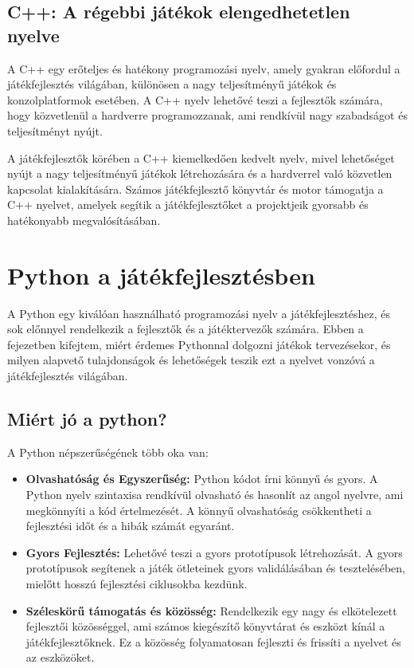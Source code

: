 \subsection{C++: A régebbi játékok elengedhetetlen nyelve}

 A C++ \cite{cpp-doc, cpp} egy erőteljes és hatékony programozási nyelv, amely gyakran előfordul a játékfejlesztés világában, különösen a nagy teljesítményű játékok és konzolplatformok esetében. A C++ nyelv lehetővé teszi a fejlesztők számára, hogy közvetlenül a hardverre programozzanak, ami rendkívül nagy szabadságot és teljesítményt nyújt.

A játékfejlesztők körében a C++ kiemelkedően kedvelt nyelv, mivel lehetőséget nyújt a nagy teljesítményű játékok létrehozására és a hardverrel való közvetlen kapcsolat kialakítására. Számos játékfejlesztő könyvtár és motor támogatja a C++ nyelvet, amelyek segítik a játékfejlesztőket a projektjeik gyorsabb és hatékonyabb megvalósításában.


\section{Python a játékfejlesztésben}

 A Python \cite{python} egy kiválóan használható programozási nyelv a játékfejlesztéshez, és sok előnnyel rendelkezik a fejlesztők és a játéktervezők számára. Ebben a fejezetben kifejtem, miért érdemes Pythonnal dolgozni játékok tervezésekor, és milyen alapvető tulajdonságok és lehetőségek teszik ezt a nyelvet vonzóvá a játékfejlesztés világában.

\subsection{Miért jó a python?}
A Python népszerűségének több oka van: \cite{why-is-python}

\begin{itemize}
\item    \textbf{Olvashatóság és Egyszerűség:}
    Python kódot írni könnyű és gyors. A Python nyelv szintaxisa rendkívül olvasható és hasonlít az angol nyelvre, ami megkönnyíti a kód értelmezését. A könnyű olvashatóság csökkentheti a fejlesztési időt és a hibák számát egyaránt. 
    
\item    \textbf{Gyors Fejlesztés:}
    Lehetővé teszi a gyors prototípusok létrehozását. A gyors prototípusok segítenek a játék ötleteinek gyors validálásában és tesztelésében, mielőtt hosszú fejlesztési ciklusokba kezdünk.
    
\item    \textbf{Széleskörű támogatás és közösség:}
    Rendelkezik egy nagy és elkötelezett fejlesztői közösséggel, ami számos kiegészítő könyvtárat és eszközt kínál a játékfejlesztőknek. Ez a közösség folyamatosan fejleszti és frissíti a nyelvet és az eszközöket.
\end{itemize}


